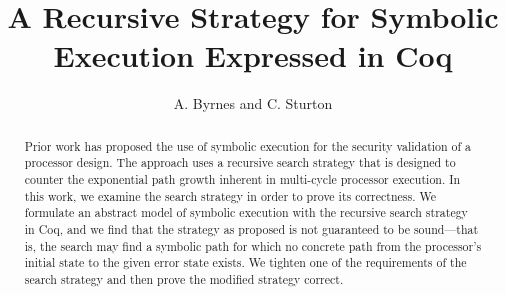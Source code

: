 \documentclass[runningheads]{llncs}
\begin{document}
\title{A Recursive Strategy for Symbolic Execution Expressed in Coq}
\author{A. Byrnes and C. Sturton}




\maketitle

\begin{abstract}
Prior work has proposed the use of symbolic execution for the security
validation of a processor design. The approach uses a recursive search strategy
that is designed to counter the exponential path growth inherent in multi-cycle
processor execution. In this work, we examine the search strategy in order to
prove its correctness. We formulate an abstract model of symbolic execution with
the recursive search strategy in Coq, and we find that the
strategy as proposed is not guaranteed to be sound---that is, the
search may find a symbolic path for which no concrete path from the processor's initial state
to the given error state exists. We tighten one of the requirements of the
search strategy and then prove the modified strategy correct. 
\end{abstract}





%




%




\end{document}
